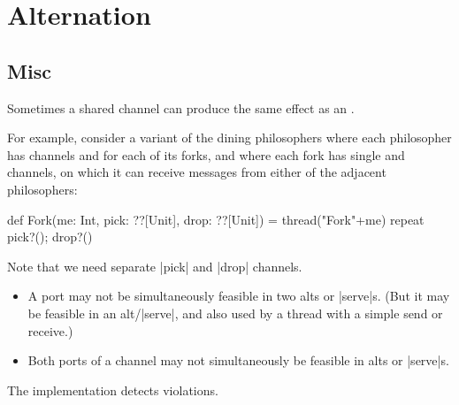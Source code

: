 \chapter{Alternation} 
\label{chap:alts}



\section{Misc}

\begin{slide}

Sometimes a shared channel can produce the same effect as an .

For example, consider a variant of the dining philosophers where each
philosopher has channels  and  for each of its
forks, and where each fork has single  and 
channels, on which it can receive messages from either of the adjacent
philosophers:
%
\begin{scala}
  def Fork(me: Int, pick: ??[Unit], drop: ??[Unit]) = thread("Fork"+me){
    repeat{ pick?(); drop?() }
  }
\end{scala}
%
Note that we need separate |pick| and |drop| channels.
\end{slide}



\begin{slide}

\begin{itemize}


\item A port may not be simultaneously feasible in two alts or |serve|s.
  (But it may be feasible in an alt/|serve|, and also used by a thread with
  a simple send or receive.)

\item Both ports of a channel may not simultaneously be feasible in alts or
  |serve|s.
\end{itemize}
%
The implementation  detects violations. 
\end{slide}

